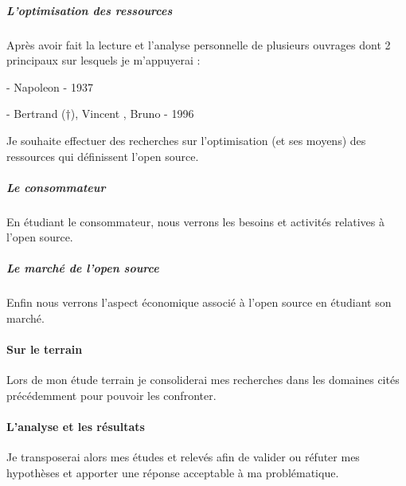 			\subparagraph{L'optimisation des ressources\\}
		
				Après avoir fait la lecture et l'analyse personnelle de plusieurs ouvrages dont 2 principaux sur lesquels je m'appuyerai : 
		
				\begin{displayquote}
					 - Napoleon  - 1937
				\end{displayquote}
				\begin{displayquote}
					 - Bertrand  (†), Vincent , Bruno \bsc{Jarrosson} - 1996
				\end{displayquote}
		
				Je souhaite effectuer des recherches sur l'optimisation (et ses moyens) des ressources qui définissent l'open source.

			\subparagraph{Le consommateur\\}
				En étudiant le consommateur, nous verrons les besoins et activités relatives à l'open source.

			\subparagraph{Le marché de l'open source\\}
				Enfin nous verrons l'aspect économique associé à l'open source en étudiant son marché.

		\paragraph{Sur le terrain \\}
			Lors de mon étude terrain je consoliderai mes recherches dans les domaines cités précédemment pour pouvoir les confronter.

		\paragraph{L'analyse et les résultats \\}
			Je transposerai alors mes études et relevés afin de valider ou réfuter mes hypothèses et apporter une réponse acceptable à ma problématique.